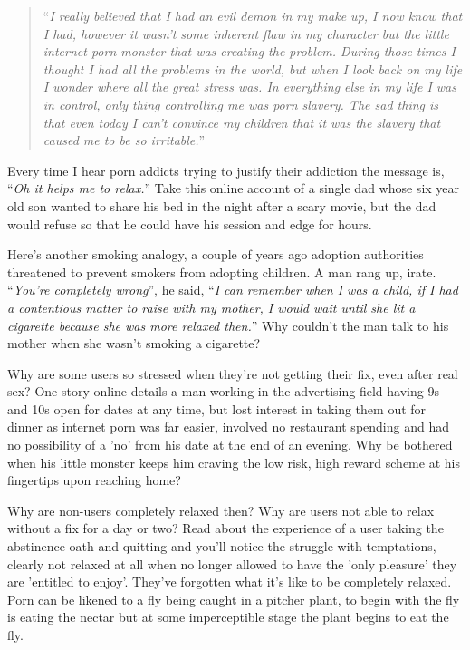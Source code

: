 \documentclass[
]{book}
\begin{document}
\begin{quote}
``\emph{I really believed that I had an evil demon in my make up, I now know that I had, however it wasn't some inherent flaw in my character but the little internet porn monster that was creating the problem. During those times I thought I had all the problems in the world, but when I look back on my life I wonder where all the great stress was. In everything else in my life I was in control, only thing controlling me was porn slavery. The sad thing is that even today I can't convince my children that it was the slavery that caused me to be so irritable.}''
\end{quote}

Every time I hear porn addicts trying to justify their addiction the message is, ``\emph{Oh it helps me to relax.}'' Take this online account of a single dad whose six year old son wanted to share his bed in the night after a scary movie, but the dad would refuse so that he could have his session and edge for hours.

Here's another smoking analogy, a couple of years ago adoption authorities threatened to prevent smokers from adopting children. A man rang up, irate. ``\emph{You're completely wrong}'', he said, ``\emph{I can remember when I was a child, if I had a contentious matter to raise with my mother, I would wait until she lit a cigarette because she was more relaxed then.}'' Why couldn't the man talk to his mother when she wasn't smoking a cigarette?

Why are some users so stressed when they're not getting their fix, even after real sex? One story online details a man working in the advertising field having 9s and 10s open for dates at any time, but lost interest in taking them out for dinner as internet porn was far easier, involved no restaurant spending and had no possibility of a 'no' from his date at the end of an evening. Why be bothered when his little monster keeps him craving the low risk, high reward scheme at his fingertips upon reaching home?

Why are non-users completely relaxed then? Why are users not able to relax without a fix for a day or two? Read about the experience of a user taking the abstinence oath and quitting and you'll notice the struggle with temptations, clearly not relaxed at all when no longer allowed to have the 'only pleasure' they are 'entitled to enjoy'. They've forgotten what it's like to be completely relaxed. Porn can be likened to a fly being caught in a pitcher plant, to begin with the fly is eating the nectar but at some imperceptible stage the plant begins to eat the fly.
\end{document}
